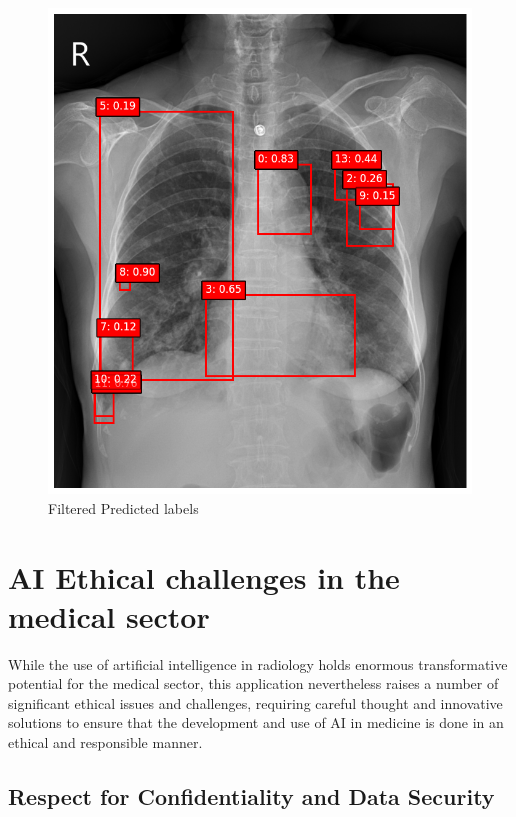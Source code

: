 \documentclass[12pt,oneside]{book} %
\begin{document}
\begin{figure}[H]
\begin{minipage}[b]{0.45\textwidth}
        \includegraphics[width=\textwidth]{../results/predictions_with_filter.png}
        \caption{Filtered Predicted labels}
        \label{fig:predictions_with_filter} %
    \end{minipage}
\end{figure}

\newpage
\section{AI Ethical challenges in the medical sector}

While the use of artificial intelligence in radiology holds enormous
transformative potential for the medical sector, this application nevertheless
raises a number of significant ethical issues and challenges, requiring careful
thought and innovative solutions to ensure that the development and use of AI
in medicine is done in an ethical and responsible manner.

\subsection{Respect for Confidentiality and Data Security}
\end{document}
